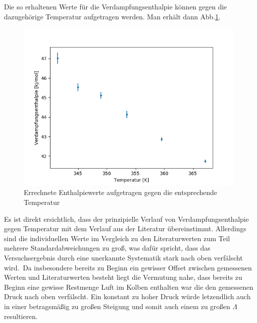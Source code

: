 \documentclass[12pt,a4paper]{article}
\begin{document}
Die so erhaltenen Werte für die Verdampfungsenthalpie können gegen die dazugehörige Temperatur aufgetragen werden. Man erhält dann Abb.\ref{fig:EntTempB}.

\begin{figure}
\begin{center}
\includegraphics[scale=0.8]{Bilder/Enthalpie_gegen_TempB}
\caption[Enthalpie - Temperatur]{Errechnete Enthalpiewerte aufgetragen gegen die entsprechende Temperatur}
\label{fig:EntTempB}
\end{center}
\end{figure}

Es ist direkt ersichtlich, dass der prinzipielle Verlauf von Verdampfungsenthalpie gegen Temperatur mit dem Verlauf aus der Literatur übereinstimmt. Allerdings sind die individuellen Werte im Vergleich zu den Literaturwerten zum Teil mehrere Standardabweichungen zu groß, was dafür spricht, dass das Versuchsergebnis durch eine unerkannte Systematik stark nach oben verfälscht wird.\
Da insbesondere bereits zu Beginn ein gewisser Offset zwischen gemessenen Werten und Literaturwerten besteht liegt die Vermutung nahe, dass bereits zu Beginn eine gewisse Restmenge Luft im Kolben enthalten war die den gemessenen Druck nach oben verfälscht. Ein konstant zu hoher Druck würde letzendlich auch in einer betragsmäßig zu großen Steigung und somit auch einem zu großen $\Lambda$ resultieren.
\end{document}
